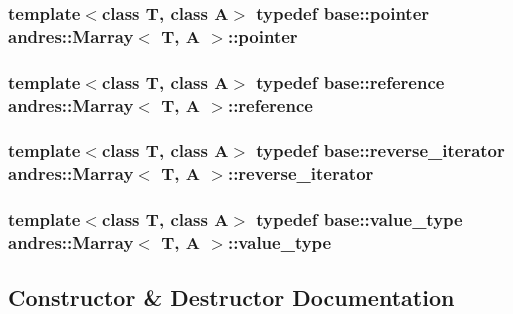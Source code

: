 \subsubsection[{pointer}]{\setlength{\rightskip}{0pt plus 5cm}template$<$class T, class A$>$ typedef {\bf base\+::pointer} {\bf andres\+::\+Marray}$<$ T, A $>$\+::{\bf pointer}}\label{classandres_1_1Marray_a42f16cbe0ebc93347dd9eed78484e951}
\hypertarget{classandres_1_1Marray_a20b76b3ff5480625dfad98caf0ec9649}{}
\subsubsection[{reference}]{\setlength{\rightskip}{0pt plus 5cm}template$<$class T, class A$>$ typedef {\bf base\+::reference} {\bf andres\+::\+Marray}$<$ T, A $>$\+::{\bf reference}}\label{classandres_1_1Marray_a20b76b3ff5480625dfad98caf0ec9649}
\hypertarget{classandres_1_1Marray_a9125dfa109e0a43ccd18081fd64ed65e}{}
\subsubsection[{reverse\+\_\+iterator}]{\setlength{\rightskip}{0pt plus 5cm}template$<$class T, class A$>$ typedef {\bf base\+::reverse\+\_\+iterator} {\bf andres\+::\+Marray}$<$ T, A $>$\+::{\bf reverse\+\_\+iterator}}\label{classandres_1_1Marray_a9125dfa109e0a43ccd18081fd64ed65e}
\hypertarget{classandres_1_1Marray_a902cba550c99fb1db7b6b95edb0ca4df}{}
\subsubsection[{value\+\_\+type}]{\setlength{\rightskip}{0pt plus 5cm}template$<$class T, class A$>$ typedef {\bf base\+::value\+\_\+type} {\bf andres\+::\+Marray}$<$ T, A $>$\+::{\bf value\+\_\+type}}\label{classandres_1_1Marray_a902cba550c99fb1db7b6b95edb0ca4df}


\subsection{Constructor \& Destructor Documentation}
\hypertarget{classandres_1_1Marray_ae04d0a668897b7c72eb548c303804254}{}
